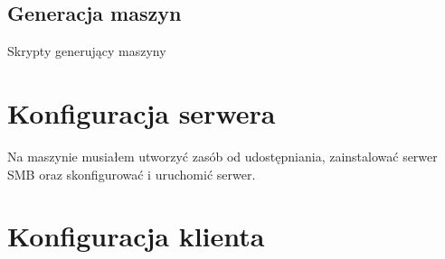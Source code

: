 \documentclass{article} %
\begin{document}
\subsection{Generacja maszyn}
Skrypty generujący maszyny




\section{Konfiguracja serwera}
Na maszynie musiałem utworzyć zasób od udostępniania, zainstalować serwer SMB oraz skonfigurować i uruchomić serwer.



\section{Konfiguracja klienta}

\end{document}
